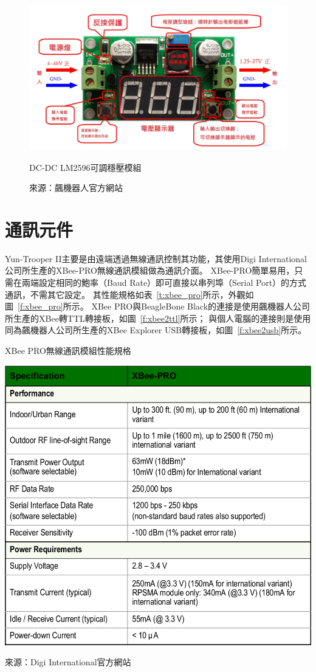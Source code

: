 \begin{figure}[h!]
	\centering
	\includegraphics[width=14cm]{figures/LM2596}
	\caption{DC-DC LM2596可調穩壓模組}
	\caption*{來源：飆機器人官方網站}
	\label{f:lm2596}
\end{figure}

\section{通訊元件}
Yun-Trooper II主要是由遠端透過無線通訊控制其功能，其使用Digi International公司所生產的XBee-PRO無線通訊模組做為通訊介面。
XBee-PRO簡單易用，只需在兩端設定相同的鮑率（Baud Rate）即可直接以串列埠（Serial Port）的方式通訊，不需其它設定。
其性能規格如表~\ref{t:xbee_pro}所示，外觀如圖~\ref{f:xbee_pro}所示。
XBee PRO與BeagleBone Black的連接是使用飆機器人公司所生產的XBee轉TTL轉接板，如圖~\ref{f:xbee2ttl}所示；
與個人電腦的連接則是使用同為飆機器人公司所生產的XBee Explorer USB轉接板，如圖~\ref{f:xbee2usb}所示。

\begin{table}[h!]
	\centering
	\caption{XBee PRO無線通訊模組性能規格}
	\label{t:xbee_pro}
	\includegraphics[width=\textwidth]{tables/XBee_PRO}
	\caption*{來源：Digi International官方網站}
\end{table}

